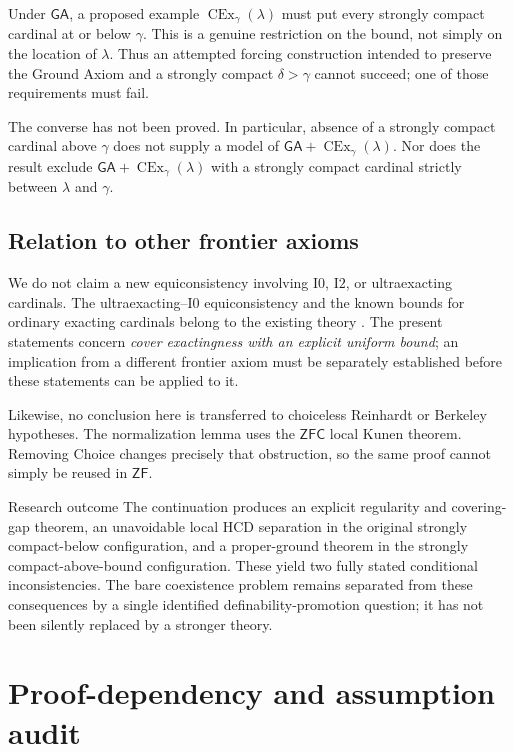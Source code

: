 \documentclass[11pt,letterpaper]{article}
\theoremstyle{definition}
\newcommand{\ZFC}{\mathsf{ZFC}}
\newcommand{\ZF}{\mathsf{ZF}}
\newcommand{\CEx}{\operatorname{CEx}}
\newcommand{\Izero}{\mathrm{I0}}
\newcommand{\Itwo}{\mathrm{I2}}
\newcommand{\GA}{\mathsf{GA}}
\begin{document}
Under $\GA$, a proposed example $\CEx_\gamma(\lambda)$ must put every strongly compact cardinal at or below $\gamma$. This is a genuine restriction on the bound, not simply on the location of $\lambda$. Thus an attempted forcing construction intended to preserve the Ground Axiom and a strongly compact $\delta>\gamma$ cannot succeed; one of those requirements must fail.

The converse has not been proved. In particular, absence of a strongly compact cardinal above $\gamma$ does not supply a model of $\GA+\CEx_\gamma(\lambda)$. Nor does the result exclude $\GA+\CEx_\gamma(\lambda)$ with a strongly compact cardinal strictly between $\lambda$ and $\gamma$.

\subsection{Relation to other frontier axioms}

We do not claim a new equiconsistency involving $\Izero$, $\Itwo$, or ultraexacting cardinals. The ultraexacting--$\Izero$ equiconsistency and the known bounds for ordinary exacting cardinals belong to the existing theory \cite{beyondhod}. The present statements concern \emph{cover exactingness with an explicit uniform bound}; an implication from a different frontier axiom must be separately established before these statements can be applied to it.

Likewise, no conclusion here is transferred to choiceless Reinhardt or Berkeley hypotheses. The normalization lemma uses the $\ZFC$ local Kunen theorem. Removing Choice changes precisely that obstruction, so the same proof cannot simply be reused in $\ZF$.

\begin{assessment}{Research outcome}
The continuation produces an explicit regularity and covering-gap theorem, an unavoidable local HCD separation in the original strongly compact-below configuration, and a proper-ground theorem in the strongly compact-above-bound configuration. These yield two fully stated conditional inconsistencies. The bare coexistence problem remains separated from these consequences by a single identified definability-promotion question; it has not been silently replaced by a stronger theory.
\end{assessment}

\appendix
\section{Proof-dependency and assumption audit}\label{app:audit}
\end{document}
